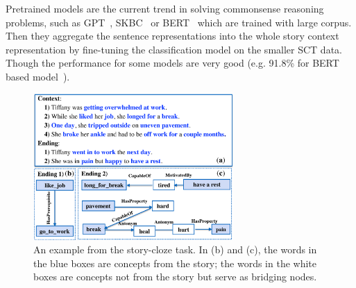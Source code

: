 Pretrained models are the current trend in solving
commonsense reasoning problems, such as 
GPT~\cite{radford2018improving}, SKBC~\cite{kiros2015skip} or BERT~\cite{devlin2018bert}  
which are trained with large corpus. Then they aggregate the sentence representations
into the whole story context representation by 
fine-tuning the classification model on the smaller SCT data. 
Though the performance for some models are very good
(e.g. 91.8\% for BERT based model~\cite{li2019story}).

\begin{figure}[th]
\centering\includegraphics[width=3in]{pictures/story_example}
\caption{An example from the story-cloze task. 
In (b) and (c), the words in the blue boxes are concepts from the story; 
the words in the white boxes are concepts not from the story 
but serve as bridging nodes. }
\label{fig:story}
\end{figure}

